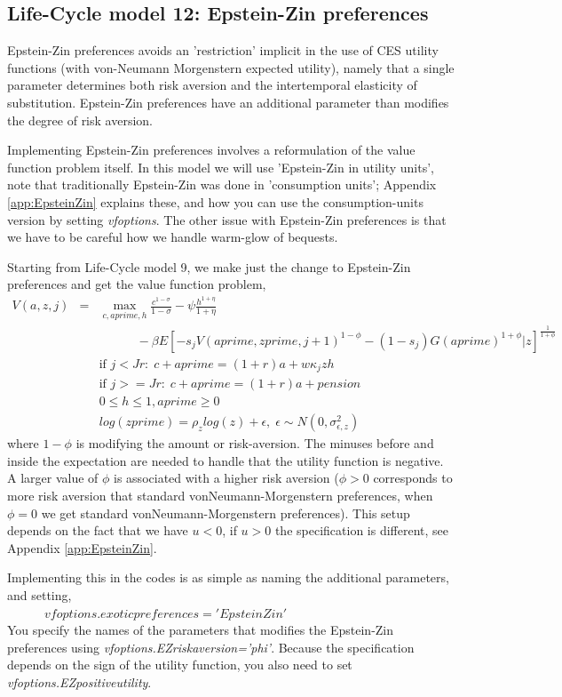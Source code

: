 \subsection{Life-Cycle model 12: Epstein-Zin preferences}
Epstein-Zin preferences avoids an 'restriction' implicit in the use of CES utility functions (with von-Neumann Morgenstern expected utility), namely that a single parameter determines both risk aversion and the intertemporal elasticity of substitution. Epstein-Zin preferences have an additional parameter than modifies the degree of risk aversion.

Implementing Epstein-Zin preferences involves a reformulation of the value function problem itself. In this model we will use 'Epstein-Zin in utility units', note that traditionally Epstein-Zin was done in 'consumption units'; Appendix \ref{app:EpsteinZin} explains these, and how you can use the consumption-units version by setting \textit{vfoptions}. The other issue with Epstein-Zin preferences is that we have to be careful how we handle warm-glow of bequests.

Starting from Life-Cycle model 9, we make just the change to Epstein-Zin preferences and get the value function problem,
\begin{eqnarray*}
 V(a,z,j)&=& \max_{c,aprime,h} \frac{c^{1-\sigma}}{1-\sigma} - \psi \frac{h^{1+\eta}}{1+\eta}   \\
 && \quad \quad \quad - \beta E[- s_j V(aprime,zprime,j+1)^{1-\phi} - (1-s_j)G(aprime)^{1+\phi} |z]^{\frac{1}{1+\phi}} \\
&& \text{if }j<Jr: \; c+aprime=(1+r)a+w \kappa_j z h\\
&& \text{if }j>=Jr: \; c+aprime=(1+r)a +pension\\
&& 0\leq h \leq 1, aprime\geq 0 \\
&& log(zprime)=\rho_z log(z) + \epsilon, \; \epsilon \sim N(0,\sigma_{\epsilon,z}^2)
\end{eqnarray*}
where $1-\phi$ is modifying the amount or risk-aversion. The minuses before and inside the expectation are needed to handle that the utility function is negative. A larger value of $\phi$ is associated with a higher risk aversion ($\phi>0$ corresponds to more risk aversion that standard vonNeumann-Morgenstern preferences, when $\phi=0$ we get standard vonNeumann-Morgenstern preferences). This setup depends on the fact that we have $u<0$, if $u>0$ the specification is different, see Appendix \ref{app:EpsteinZin}.

Implementing this in the codes is as simple as naming the additional parameters, and setting,
\\ $\quad \quad \quad vfoptions.exoticpreferences='EpsteinZin'$
\\ \noindent You specify the names of the parameters that modifies the Epstein-Zin preferences using \textit{vfoptions.EZriskaversion='phi'}. Because the specification depends on the sign of the utility function, you also need to set \textit{vfoptions.EZpositiveutility}.

